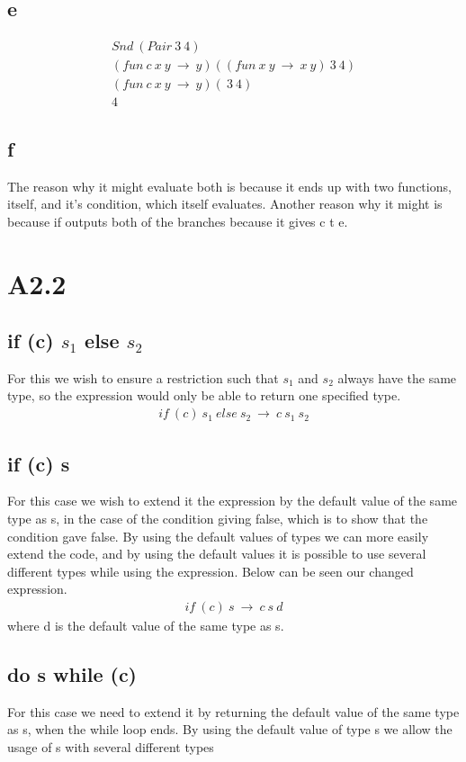 \documentclass[10pt,a4paper]{article}      %
\begin{document}
\subsection*{e}
\begin{align*}
Snd \ (Pair \ 3 \ 4) \\
(fun \ c \ x \ y \ \rightarrow \ y)((fun \ x \ y \ \rightarrow \ x \ y) \ 3 \ 4) \\
(fun \ c \ x \ y \ \rightarrow \ y)( \ 3 \ 4) \\
4
\end{align*}

\subsection*{f}
The reason why it might evaluate both is because it ends up with two functions, itself, and it's condition, which itself evaluates. Another reason why it might is because if outputs both of the branches because it gives c t e. 

\section*{A2.2}
\subsection*{if (c) $s_1$ else $s_2$}
For this we wish to ensure a restriction such that $s_1$ and $s_2$ always have the same type, so the expression would only be able to return one specified type.
\begin{align*}
if \ (c) \ s_1 \ else \ s_2 \ \rightarrow \ c \ s_1 \ s_2
\end{align*}
\subsection*{if (c) s}
For this case we wish to extend it the expression by the default value of the same type as s, in the case of the condition giving false, which is to show that the condition gave false. By using the default values of types we can more easily extend the code, and by using the default values it is possible to use several different types while using the expression. Below can be seen our changed expression.
\begin{align*}
if \ (c) \ s \ \rightarrow \ c \ s \ d
\end{align*}
where d is the default value of the same type as s.

\subsection*{do s while (c)}
For this case we need to extend it by returning the default value of the same type as s, when the while loop ends. By using the default value of type s we allow the usage of s with several different types 
\end{document}
